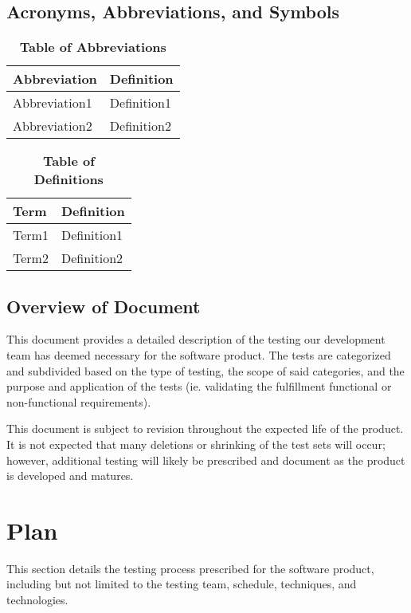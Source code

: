 \documentclass[12pt, titlepage]{article}
\begin{document}
	\subsection{Acronyms, Abbreviations, and Symbols}
	
	\begin{table}[hbp]
		\caption{\textbf{Table of Abbreviations}} \label{Table}
		\begin{tabularx}{\textwidth}{p{3cm}X}
			\toprule
			\textbf{Abbreviation} & \textbf{Definition} \\
			\midrule
			Abbreviation1 & Definition1\\
			Abbreviation2 & Definition2\\
			\bottomrule
		\end{tabularx}
	\end{table}
	\begin{table}[!htbp]
		\caption{\textbf{Table of Definitions}} \label{Table}
		\begin{tabularx}{\textwidth}{p{3cm}X}
			\toprule
			\textbf{Term} & \textbf{Definition}\\
			\midrule
			Term1 & Definition1\\
			Term2 & Definition2\\
			\bottomrule
		\end{tabularx}
	\end{table}	
	\subsection{Overview of Document}
	\indent \indent This document provides a detailed description of the 
	testing our development team has deemed necessary for the software product. 
	The tests are categorized and subdivided based on the type of testing, the 
	scope of said categories, and the purpose and application of the tests (ie. 
	validating the fulfillment functional or non-functional requirements).\par
	This document is subject to revision throughout the expected life of the 
	product. It is not expected that many deletions or shrinking of the test 
	sets will occur; however, additional testing will likely be prescribed and 
	document as the product is developed and matures.
	
	\section{Plan}
	This section details the testing process prescribed for the software 
	product, including but not limited to the testing team, schedule, 
	techniques, and technologies.
\end{document}
